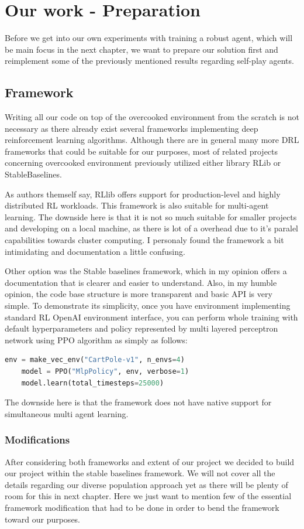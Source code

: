 \chapter{Our work - Preparation}
Before we get into our own experiments with training a robust agent, which will be main focus in the next chapter, we want to prepare our solution first and reimplement some of the previously mentioned results regarding self-play agents.

\section{Framework}
Writing all our code on top of the overcooked environment from the scratch is not necessary as there already exist several frameworks implementing deep reinforcement learning algorithms.
Although there are in general many more DRL frameworks that could be suitable for our purposes, most of related projects concerning overcooked environment previously utilized either library RLib or StableBaselines.

As authors themself say, RLlib offers support for production-level and highly distributed RL workloads.
This framework is also suitable for multi-agent learning.
The downside here is that it is not so much suitable for smaller projects and developing on a local machine, as there is lot of a overhead due to it's paralel capabilities towards cluster computing.
I personaly found the framework a bit intimidating and documentation a little confusing.

Other option was the Stable baselines framework, which in my opinion offers a documentation that is clearer and easier to understand.
Also, in my humble opinion, the code base structure is more transparent and basic API is very simple.
To demonstrate its simplicity, once you have environment implementing standard RL OpenAI environment interface, you can perform whole training with default hyperparameters and policy represented by multi layered perceptron network using PPO algorithm as simply as follows:
\begin{lstlisting}[language=Python]
    env = make_vec_env("CartPole-v1", n_envs=4)
    model = PPO("MlpPolicy", env, verbose=1)
    model.learn(total_timesteps=25000)

\end{lstlisting}
The downside here is that the framework does not have native support for simultaneous multi agent learning.

\subsection{Modifications}
After considering both frameworks and extent of our project we decided to build our project within the stable baselines framework.
We will not cover all the details regarding our diverse population approach yet as there will be plenty of room for this in next chapter.
Here we just want to mention few of the essential framework modification that had to be done in order to bend the framework toward our purposes.

